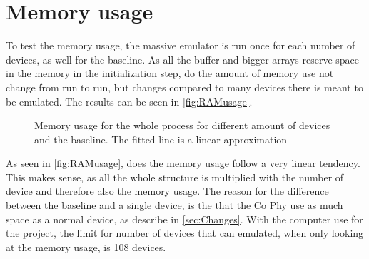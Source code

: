 \section{Memory usage}
To test the memory usage, the massive emulator is run once for each number of devices, as well for the baseline. As all the buffer and bigger arrays reserve space in the memory in the initialization step, do the amount of memory use not change from run to run, but changes compared to many devices there is meant to be emulated. The results can be seen in \autoref{fig:RAMusage}.

\begin{figure}[H]
\centering
\resizebox{0.5\textwidth}{!}{
}
\caption{Memory usage for the whole process for different amount of devices and the baseline. The fitted line is a linear approximation}
\label{fig:RAMusage}
\end{figure}

As seen in \autoref{fig:RAMusage}, does the memory usage follow a very linear tendency. This makes sense, as all the whole structure is multiplied with the number of device and therefore also the memory usage. The reason for the difference between the baseline and a single device, is the that the Co Phy use as much space as a normal device, as describe in \autoref{sec:Changes}. With the computer use for the project, the limit for number of devices that can emulated, when only looking at the memory usage, is 108 devices.



